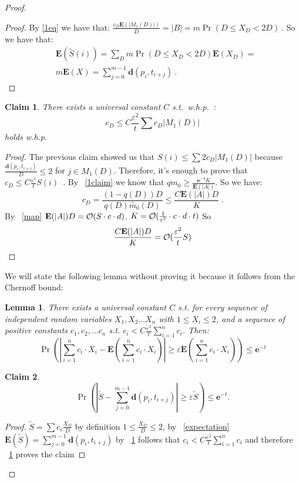 \documentclass[11pt]{article}
\newcommand{\calO}{{\cal{O}}}
\newtheorem{lem}[thm]{Lemma}
\newtheorem{claim}{Claim}[section]
\newcommand{\be}{\begin{equation}}
\newcommand{\ee}{\end{equation}}
\newcommand{\envert}[1]{\left\lvert#1\right\rvert}
\let\abs=\envert
\newcommand{\bfE}{\textbf{E}}
\newcommand{\bfe}{\textbf{e}}
\newcommand{\dist}{\textbf{d}}
\begin{document}
\begin{proof}
\begin{proof}
By \eqref{1eq} we have that: $\frac{c_D\bfE(\abs{M_1(D)})}{D}=\abs{B}=m\Pr(D\leq X_D <2D)\ .$
So we have that:
\begin{equation}
\begin{split}
 &\bfE(\tilde{S}(i))=\sum_D m\Pr(D\leq X_D <2D)\bfE(X_D)=\\
 &m\bfE(X)=\sum_{j=0}^{m-1} \dist(p_i,t_{i+j})\ .
\end{split}
\end{equation}
\end{proof}
\begin{claim}\label{bound}
There exists a universal constant  $C$ s.t.\ w.h.p.\ :
\[c_D\leq C \frac{\varepsilon^2}{t} \sum c_D\abs{M_1(D)}\]
holds w.h.p.
\end{claim}
\begin{proof}
The previous claim showed us that $S(i) \leq \sum 2c_D\abs{M_1(D)}$ because $ \frac{\dist(p_i,t_{i+j})}{D}\leq 2 $ for $j\in M_1(D)$. Therefore, it's enough to prove that $c_D\leq C \frac{\varepsilon^2}{t}S(i)$\ .
By ~\ref{1claim} we know that $q m_0\geq \frac{\bfe^{-4}K}{\bfE(\abs{A})}$. So we have:
\be
c_D=\frac{(1-q(D))D}{q(D)\tilde{m_0}(D)}\leq \frac{C \bfE(\abs{A})D}{K}\ .
\ee
By ~\ref{map} $\bfE(\abs{A})D=\calO(S\cdot c\cdot d)$. $K=\calO(\frac{1}{\varepsilon^2}
\cdot c\cdot d\cdot t )$ So
\be
\frac{C \bfE(\abs{A})D}{K}=\calO(\frac{\varepsilon^2}{t}S)
\ee
\end{proof}
We will state the
following lemma without proving it because it follows from the Chernoff bound:
\begin{lem}\label{e-bound0}
There exists a universal constant $C$ s.t. for every sequence of
independent random variables $X_1,X_2\ldots X_n$ with $1\leq X_i
\leq2$, and a sequence of positive constants $c_1,c_2, \ldots c_n$
s.t. $c_i < C \frac{\varepsilon^2}{t} \displaystyle\sum_{i=1}^{n}
c_i$. Then:
$$
\Pr\left(\abs{\sum_{i=1}^n c_i\cdot X_i-\bfE(\sum_{i=1}^n c_i\cdot
X_i)}\geq \varepsilon\bfE(\sum_{i=1}^n c_i\cdot X_i)\right)\leq
\bfe^{-t}
$$
\end{lem}
\begin{claim}
\be \Pr(\abs{\tilde{S}-\sum_{j=0}^{m-1} \dist(p_i,t_{i+j})} \geq
\varepsilon \tilde{S}) \leq \bfe^{-t}. \ee
\end{claim}
\begin{proof}
$\tilde{S}=\sum c_i \frac{X_D}{D}$ by definition $1\leq\frac{X_D}{D}\leq 2$, by ~\ref{expectation} $\bfE(\tilde{S})=\sum_{j=0}^{m-1} \dist(p_i,t_{i+j})$ by ~\ref{bound} follows that $c_i < C \frac{\varepsilon^2}{t} \displaystyle\sum_{i=1}^{n}
c_i$ and therefore ~\ref{e-bound0} proves the claim
\end{proof}

\end{proof} 
\end{document}
